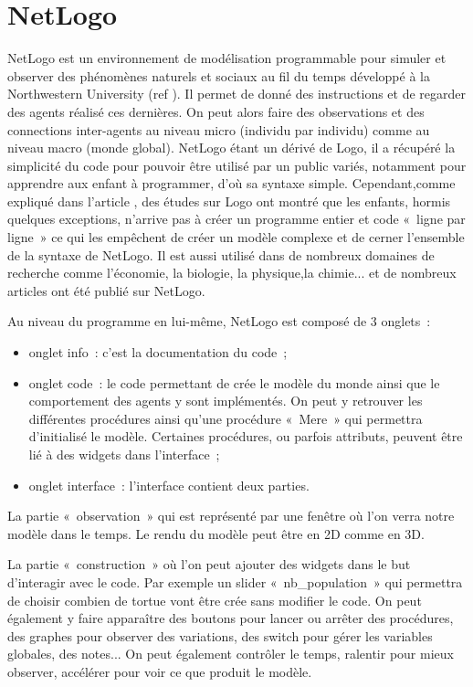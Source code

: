 \section{NetLogo}
\label{NetLogo}

NetLogo est un environnement de modélisation programmable pour simuler et observer des phénomènes naturels et sociaux au fil du temps développé à la Northwestern University (ref \cite{netlogo}). Il permet de donné des instructions et de regarder des agents réalisé ces dernières. On peut alors faire des observations et des connections inter-agents au niveau micro (individu par individu) comme au niveau macro (monde global).
NetLogo étant un dérivé de Logo, il a récupéré la simplicité du code pour pouvoir être utilisé par un public variés, notamment pour apprendre aux enfant à programmer, d'où sa syntaxe simple. Cependant,comme expliqué dans l'article \cite{Logo}, des études sur Logo ont montré que les enfants, hormis quelques exceptions, n'arrive pas à créer un programme entier et code «~ligne par ligne~» ce qui les empêchent de créer un modèle complexe et de cerner l'ensemble de la syntaxe de NetLogo.
Il est aussi utilisé dans de nombreux domaines de recherche comme l'économie, la biologie, la physique,la chimie... et de nombreux articles ont été publié sur NetLogo.

Au niveau du programme en lui-même, NetLogo est composé de 3 onglets~:
\begin{itemize}
	\item onglet info~: c'est la documentation du code~;
	\item onglet code~: le code permettant de crée le modèle du monde ainsi que le comportement des agents y sont implémentés. On peut y retrouver les différentes procédures ainsi qu'une procédure «~Mere~» qui permettra d'initialisé le modèle. Certaines procédures, ou parfois attributs, peuvent être lié à des widgets dans l'interface~;
	\item onglet interface~: l'interface contient deux parties.
\end{itemize}

La partie «~observation~» qui est représenté par une fenêtre où l'on verra notre modèle dans le temps. Le rendu du modèle peut être en 2D comme en 3D.

La partie «~construction~» où l'on peut ajouter des widgets dans le but d’interagir avec le code. Par exemple un slider «~nb\_population~» qui permettra de choisir combien de tortue vont être crée sans modifier le code. On peut également y faire apparaître des boutons pour lancer ou arrêter des procédures, des graphes pour observer des variations, des switch pour gérer les variables globales, des notes... On peut également contrôler le temps, ralentir pour mieux observer, accélérer pour voir ce que produit le modèle.

